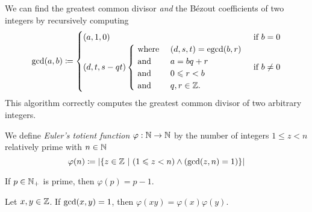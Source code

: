 \begin{algorithm}\label{alg:extdivision}
    We can find the greatest common divisor \emph{and} the B\'ezout coefficients
    of two integers by recursively computing
    \begin{equation*}
        \gcd\pn*{a, b} \defn 
        \begin{cases}
            (a, 1, 0)
                &\text{ if } b = 0\\
            (d, t, s - qt)
                \begin{cases}
                    \text{ where } &(d, s, t) = \text{egcd}\pn*{b, r}\\
                    \text{ and } &a = bq + r\\
                    \text{ and } &0 \leq r < b\\
                    \text{ and } &q, r \in \Z.
                \end{cases}
                &\text{ if } b \neq 0
        \end{cases}
    \end{equation*}
    This algorithm correctly computes the greatest common divisor of two arbitrary integers.
\end{algorithm}

\begin{definition}
    We define \emph{Euler's totient function} $\varphi: \mathbb{N} \to \mathbb{N}$ by the number of integers $1 \leq z < n$ relatively prime with $n \in \mathbb{N}$
    \begin{equation*}
        \varphi(n)
        \defn \cardinality*{\set*{z \in \Z \suchthat (1 \leq z < n) \meet \pn*{\gcd\pn*{z, n} = 1}}}
    \end{equation*}
\end{definition}

\begin{lemma}
    If $p \in \mathbb{N}_+$ is prime, then $\varphi(p) = p - 1$.
\end{lemma}

\begin{theorem}\label{thm:totient}
    Let $x, y \in \mathbb{Z}$. If $\gcd\pn*{x, y} = 1$, then $\varphi(xy) = \varphi(x)\varphi(y)$.
\end{theorem}

